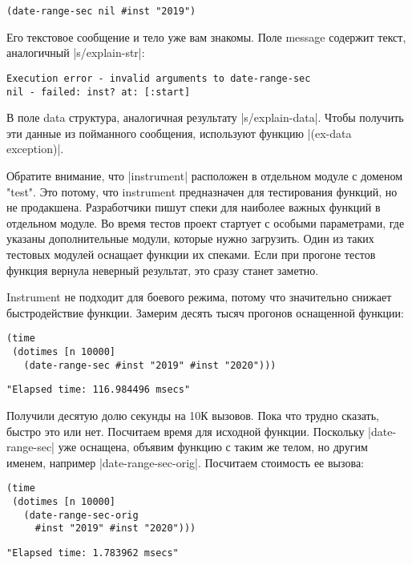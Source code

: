 \begin{verbatim}
(date-range-sec nil #inst "2019")
\end{verbatim}

Его текстовое сообщение и тело уже вам знакомы. Поле message содержит текст,
аналогичный \spverb|s/explain-str|:

\begin{verbatim}
Execution error - invalid arguments to date-range-sec
nil - failed: inst? at: [:start]
\end{verbatim}

В поле data структура, аналогичная результату \spverb|s/explain-data|. Чтобы получить
эти данные из пойманного сообщения, используют функцию \spverb|(ex-data exception)|.

Обратите внимание, что \spverb|instrument| расположен в отдельном модуле с доменом
"test". Это потому, что instrument предназначен для тестирования функций, но не
продакшена. Разработчики пишут спеки для наиболее важных функций в отдельном
модуле. Во время тестов проект стартует с особыми параметрами, где указаны
дополнительные модули, которые нужно загрузить. Один из таких тестовых модулей
оснащает функции их спеками. Если при прогоне тестов функция вернула неверный
результат, это сразу станет заметно.

Instrument не подходит для боевого режима, потому что значительно снижает
быстродействие функции. Замерим десять тысяч прогонов оснащенной функции:

\begin{verbatim}
(time
 (dotimes [n 10000]
   (date-range-sec #inst "2019" #inst "2020")))
\end{verbatim}

\begin{verbatim}
"Elapsed time: 116.984496 msecs"
\end{verbatim}

Получили десятую долю секунды на 10К вызовов. Пока что трудно сказать, быстро
это или нет. Посчитаем время для исходной функции. Поскольку \spverb|date-range-sec|
уже оснащена, объявим функцию с таким же телом, но другим именем, например
\spverb|date-range-sec-orig|. Посчитаем стоимость ее вызова:

\begin{verbatim}
(time
 (dotimes [n 10000]
   (date-range-sec-orig
     #inst "2019" #inst "2020")))
\end{verbatim}

\begin{verbatim}
"Elapsed time: 1.783962 msecs"
\end{verbatim}

